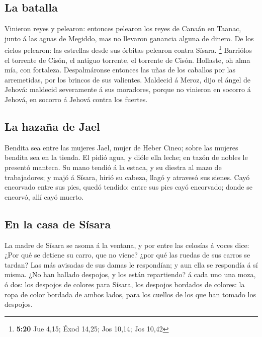 \hypertarget{la-batalla}{%
\subsection{La batalla}\label{la-batalla}}

 Vinieron reyes y pelearon: entonces pelearon los reyes
de Canaán en Taanac, junto á las aguas de Megiddo, mas no llevaron
ganancia alguna de dinero.  De los cielos pelearon: las
estrellas desde sus órbitas pelearon contra Sísara. \footnote{\textbf{5:20}
  Jue 4,15; Éxod 14,25; Jos 10,14; Jos 10,42}  Barriólos
el torrente de Cisón, el antiguo torrente, el torrente de Cisón.
Hollaste, oh alma mía, con fortaleza.  Despalmáronse
entonces las uñas de los caballos por las arremetidas, por los brincos
de sus valientes.  Maldecid á Meroz, dijo el ángel de
Jehová: maldecid severamente á sus moradores, porque no vinieron en
socorro á Jehová, en socorro á Jehová contra los fuertes.

\hypertarget{la-hazauxf1a-de-jael}{%
\subsection{La hazaña de Jael}\label{la-hazauxf1a-de-jael}}

 Bendita sea entre las mujeres Jael, mujer de Heber
Cineo; sobre las mujeres bendita sea en la tienda.  El
pidió agua, y dióle ella leche; en tazón de nobles le presentó manteca.
 Su mano tendió á la estaca, y su diestra al mazo de
trabajadores; y majó á Sísara, hirió su cabeza, llagó y atravesó sus
sienes.  Cayó encorvado entre sus pies, quedó tendido:
entre sus pies cayó encorvado; donde se encorvó, allí cayó muerto.

\hypertarget{en-la-casa-de-suxedsara}{%
\subsection{En la casa de Sísara}\label{en-la-casa-de-suxedsara}}

 La madre de Sísara se asoma á la ventana, y por entre
las celosías á voces dice: ¿Por qué se detiene su carro, que no viene?
¿por qué las ruedas de sus carros se tardan?  Las más
avisadas de sus damas le respondían; y aun ella se respondía á sí misma.
 ¿No han hallado despojos, y los están repartiendo? á
cada uno una moza, ó dos: los despojos de colores para Sísara, los
despojos bordados de colores: la ropa de color bordada de ambos lados,
para los cuellos de los que han tomado los despojos.

